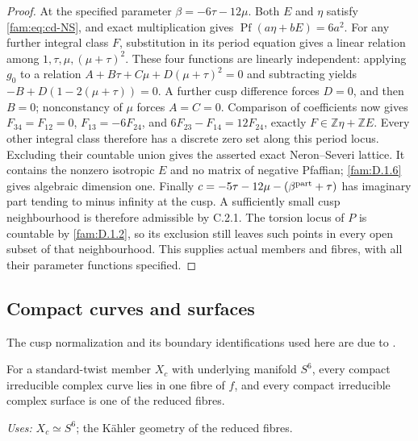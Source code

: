 \begin{proof}
At the specified parameter $\beta=-6\tau-12\mu$. Both $E$ and $\eta$
satisfy \eqref{fam:eq:cd-NS}, and exact multiplication gives
$\operatorname{Pf}(a\eta+bE)=6a^2$.
For any further integral class $F$, substitution in its period equation
gives a linear relation among $1,\tau,\mu,(\mu+\tau)^2$.
These four functions are linearly independent: applying $g_0$ to a
relation $A+B\tau+C\mu+D(\mu+\tau)^2=0$ and subtracting yields
$-B+D(1-2(\mu+\tau))=0$. A further cusp difference forces $D=0$,
and then $B=0$; nonconstancy of $\mu$ forces $A=C=0$.
Comparison of coefficients now gives
$F_{34}=F_{12}=0$, $F_{13}=-6F_{24}$, and
$6F_{23}-F_{14}=12F_{24}$, exactly
$F\in\mathbb Z\eta+\mathbb ZE$. Every other integral class therefore
has a discrete zero set along this period locus. Excluding their
countable union gives the asserted exact Neron--Severi lattice.
It contains the nonzero isotropic $E$ and no matrix of negative
Pfaffian; \ref{fam:D.1.6} gives algebraic dimension one.
Finally
$c=-5\tau-12\mu-(\beta^{\rm part}+\tau)$ has imaginary part tending
to minus infinity at the cusp. A sufficiently small cusp neighbourhood
is therefore admissible by C.2.1. The torsion locus of $P$ is countable
by \ref{fam:D.1.2}, so its exclusion still leaves such points in every open subset
of that neighbourhood. This supplies actual members and fibres, with
all their parameter functions specified.
\end{proof}

\subsection{Compact curves and surfaces}
The cusp normalization and its boundary identifications used here are due to \cite[\S4.6, Proposition~4.6]{AC26}.
\begin{proposition}[FAM D.2.1; T]\label{fam:D.2.1}
For a standard-twist member \(X_c\) with underlying manifold \(S^6\),
every compact irreducible complex curve lies in one fibre of \(f\), and
every compact irreducible complex surface is one of the reduced fibres.
\end{proposition}
\noindent\emph{Uses:} $X_c\simeq S^6$; the K\"ahler geometry of the reduced fibres.\par

